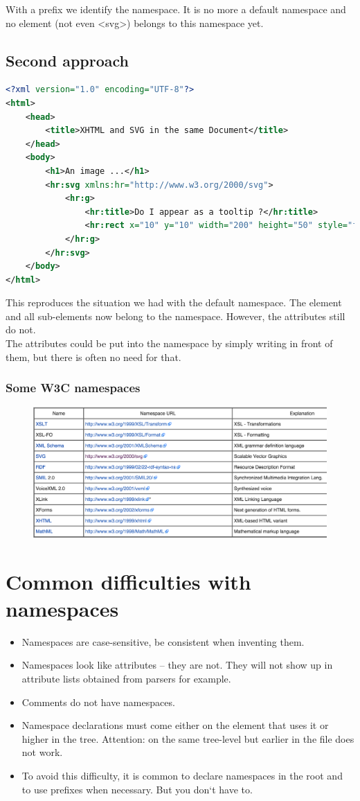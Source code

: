 With a prefix we identify the namespace. It is no more a default namespace and no element (not even <svg>) belongs to this
namespace yet.

\subsection{Second approach}
\begin{lstlisting}[language=XML, caption={Default Namespace}]
<?xml version="1.0" encoding="UTF-8"?> 
<html>
	<head>
		<title>XHTML and SVG in the same Document</title>
	</head>
	<body>
   		<h1>An image ...</h1>
		<hr:svg xmlns:hr="http://www.w3.org/2000/svg"> 
			<hr:g>
				<hr:title>Do I appear as a tooltip ?</hr:title>
				<hr:rect x="10" y="10" width="200" height="50" style="fill:blue"/> 
			</hr:g>
		</hr:svg>
  	</body>
</html>
\end{lstlisting}
This reproduces the situation we had with the default namespace. The element  and all sub-elements now belong to the
namespace. However, the attributes still do not.\\
The attributes could be put into the namespace by simply writing  in front of them, but there is often no need for that.

\subsubsection{Some W3C namespaces}
\begin{figure}[h!]
\includegraphics[width=\textwidth]{fig/W3CNamespaces.png}
\end{figure}

\section{Common difficulties with namespaces}
\begin{itemize}
\item Namespaces are case-sensitive, be consistent when inventing them.
\item Namespaces look like attributes – they are not. They will not show up in attribute lists obtained from parsers for example.
\item Comments do not have namespaces.
\item Namespace declarations must come either on the element that uses it or higher in the tree. Attention: on the same tree-level but earlier in the file does not work.
\item To avoid this difficulty, it is common to declare namespaces in the root and to use prefixes when necessary. But you don‘t have to.
\end{itemize}


